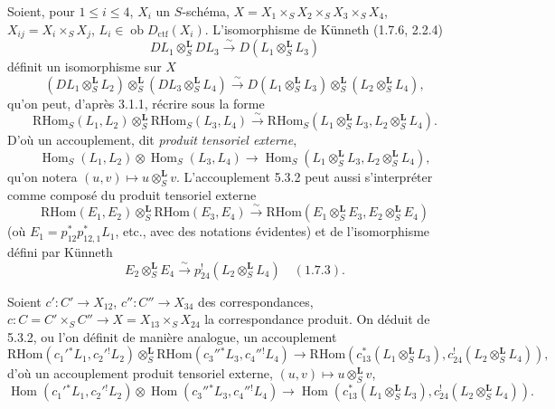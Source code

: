 \documentclass[11pt]{article}
\DeclareMathOperator{\Hom}{Hom}
\providecommand{\RHom}{\mathrm{RHom}}
\providecommand{\RHom}{\mathrm{RHom}}
\providecommand{\Hom}{\operatorname{Hom}}
\providecommand{\RHom}{\mathrm R\mathcal{H}om}
\providecommand{\RHom}{\mathrm{RHom}}
\providecommand{\Hom}{\operatorname{Hom}}
\begin{document}
Soient, pour $1\leq i\leq 4$, $X_i$ un $S$-schéma, $X=X_1\times_SX_2\times_SX_3\times_SX_4$, $X_{ij}=X_i\times_SX_j$, $L_i\in\operatorname{ob}D_{\mathrm{ctf}}(X_i)$. L'isomorphisme de Künneth (1.7.6, 2.2.4)
\[
DL_1\otimes_S^{\mathbf L}DL_3\xrightarrow{\sim}D(L_1\otimes_S^{\mathbf L}L_3)
\]
définit un isomorphisme sur $X$
\begin{equation}
\tag{5.3.1}
(DL_1\otimes_S^{\mathbf L}L_2)\otimes_S^{\mathbf L}(DL_3\otimes_S^{\mathbf L}L_4)
\xrightarrow{\sim}D(L_1\otimes_S^{\mathbf L}L_3)\otimes_S^{\mathbf L}(L_2\otimes_S^{\mathbf L}L_4),
\end{equation}
qu'on peut, d'après 3.1.1, récrire sous la forme
\begin{equation}
\tag{5.3.2}
\RHom_S(L_1,L_2)\otimes_S^{\mathbf L}\RHom_S(L_3,L_4)
\xrightarrow{\sim}\RHom_S(L_1\otimes_S^{\mathbf L}L_3,L_2\otimes_S^{\mathbf L}L_4).
\end{equation}
D'où un accouplement, dit \emph{produit tensoriel externe},
\begin{equation}
\tag{5.3.3}
\Hom_S(L_1,L_2)\otimes\Hom_S(L_3,L_4)
\longrightarrow\Hom_S(L_1\otimes_S^{\mathbf L}L_3,L_2\otimes_S^{\mathbf L}L_4),
\end{equation}
qu'on notera $(u,v)\mapsto u\otimes_S^{\mathbf L}v$. L'accouplement 5.3.2 peut aussi s'interpréter comme composé du produit tensoriel externe
\[
\RHom(E_1,E_2)\otimes_S^{\mathbf L}\RHom(E_3,E_4)
\xrightarrow{\sim}\RHom(E_1\otimes_S^{\mathbf L}E_3,E_2\otimes_S^{\mathbf L}E_4)
\]
(où $E_1=p_{12}^*p_{12,1}^*L_1$, etc., avec des notations évidentes) et de l'isomorphisme défini par Künneth
\[
E_2\otimes_S^{\mathbf L}E_4\xrightarrow{\sim}p_{24}^!(L_2\otimes_S^{\mathbf L}L_4)\quad (1.7.3).
\]

Soient $c':C'\to X_{12}$, $c'':C''\to X_{34}$ des correspondances, $c:C=C'\times_SC''\to X=X_{13}\times_SX_{24}$ la correspondance produit. On déduit de 5.3.2, ou l'on définit de manière analogue, un accouplement
\begin{equation}
\tag{5.3.4}
\RHom(c_1'{}^*L_1,c_2'{}^!L_2)\otimes_S^{\mathbf L}\RHom(c_3''{}^*L_3,c_4''{}^!L_4)
\longrightarrow\RHom(c_{13}^*(L_1\otimes_S^{\mathbf L}L_3),c_{24}^!(L_2\otimes_S^{\mathbf L}L_4)),
\end{equation}
d'où un accouplement produit tensoriel externe, $(u,v)\mapsto u\otimes_S^{\mathbf L}v$,
\begin{equation}
\tag{5.3.5}
\Hom(c_1'{}^*L_1,c_2'{}^!L_2)\otimes\Hom(c_3''{}^*L_3,c_4''{}^!L_4)
\longrightarrow\Hom(c_{13}^*(L_1\otimes_S^{\mathbf L}L_3),c_{24}^!(L_2\otimes_S^{\mathbf L}L_4)).
\end{equation}
\end{document}
